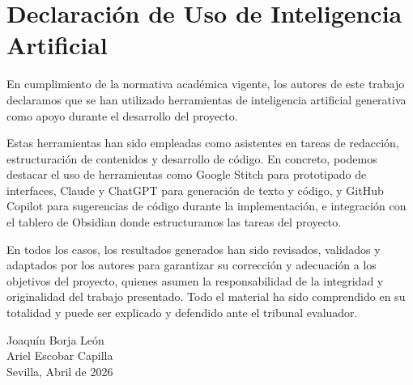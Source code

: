 
\chapter{Declaraci\'on de Uso de Inteligencia Artificial}\label{cap:uso-ia}

En cumplimiento de la normativa acad\'emica vigente, los autores de este trabajo declaramos que se han utilizado herramientas de inteligencia artificial generativa como apoyo durante el desarrollo del proyecto.

Estas herramientas han sido empleadas como asistentes en tareas de redacci\'on, estructuraci\'on de contenidos y desarrollo de c\'odigo.
En concreto, podemos destacar el uso de herramientas como Google Stitch para prototipado de interfaces, Claude y ChatGPT para generación de texto y c\'odigo, y GitHub Copilot para sugerencias de c\'odigo durante la implementaci\'on, e integración con el tablero de Obsidian donde estructuramos las tareas del proyecto.

En todos los casos, los resultados generados han sido revisados, validados y adaptados por los autores para garantizar su correcci\'on y adecuaci\'on a los objetivos del proyecto, quienes asumen la responsabilidad de la integridad y originalidad del trabajo presentado. Todo el material ha sido comprendido en su totalidad y puede ser explicado y defendido ante el tribunal evaluador.

\vspace{1cm}

\begin{flushright}
Joaqu\'in Borja Le\'on \\
Ariel Escobar Capilla \\
\vspace{0.5cm}
Sevilla, Abril de 2026
\end{flushright}

